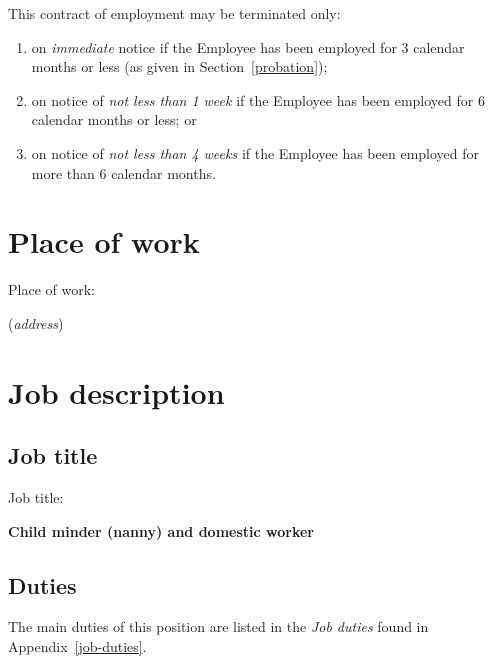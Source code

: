 \documentclass[a4paper,11pt]{article}
\begin{document}
\para This contract of employment may be terminated only:

\begin{enumerate}

  \item on \textit{immediate} notice if the Employee has been employed for 3
    calendar months or less (as given in Section~\ref{probation});

  \item on notice of \textit{not less than 1 week} if the Employee has been
    employed for 6 calendar months or less; or

  \item on notice of \textit{not less than 4 weeks} if the Employee has been
    employed for more than 6 calendar months.

\end{enumerate}

\section{Place of work}

\para Place of work:

\begin{center}


  (\textit{address})
\end{center}

\section{Job description}

\subsection{Job title}
\label{job-title}

\para Job title:

\begin{center}
   \textbf{Child minder (nanny) and domestic worker}
\end{center}

\subsection{Duties}
\label{duties}

\para The main duties of this position are listed in the \textit{Job duties}
found in Appendix~\ref{job-duties}.
\end{document}
